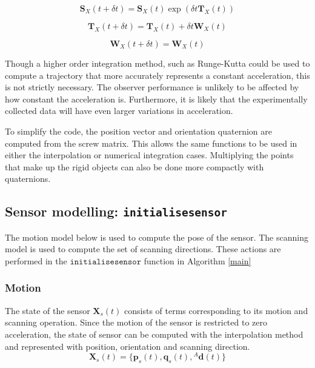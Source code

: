 \begin{equation}
	\mathbf{S}_X(t+\delta t) = \mathbf{S}_X(t)\exp({\delta t {\mathbf{T}_X(t)}})
\end{equation}

\begin{equation}
	\mathbf{T}_X(t+\delta t) = \mathbf{T}_X(t) + \delta t \mathbf{W}_X(t)
\end{equation}

\begin{equation}
	\mathbf{W}_X(t+\delta t) =\mathbf{W}_X(t)
\end{equation}

Though a higher order integration method, such as Runge-Kutta could be used to compute a trajectory that more accurately represents a constant acceleration, this is not strictly necessary. The observer performance is unlikely to be affected by how constant the acceleration is. Furthermore, it is likely that the experimentally collected data will have even larger variations in acceleration.

To simplify the code, the position vector and orientation quaternion are computed from the screw matrix. This allows the same functions to be used in either the interpolation or numerical integration cases. Multiplying the points that make up the rigid objects can also be done more compactly with quaternions.

\subsection{Sensor modelling: \texttt{initialisesensor}}
The motion model below is used to compute the pose of the sensor. The scanning model is used to compute the set of scanning directions. These actions are performed in the $\texttt{initialisesensor}$ function in Algorithm \ref{main}
\subsubsection{Motion}
The state of the sensor $\mathbf{X}_{s}(t)$ consists of terms corresponding to its motion and scanning operation. Since the motion of the sensor is restricted to zero acceleration, the state of sensor can be computed with the interpolation method and represented with position, orientation and scanning direction. 
\begin{equation}
	\mathbf{X}_{s}(t) = \{\mathbf{p}_s(t),\mathbf{q}_s(t),{^{A}\mathbf{d}(t)}\}
\end{equation}

